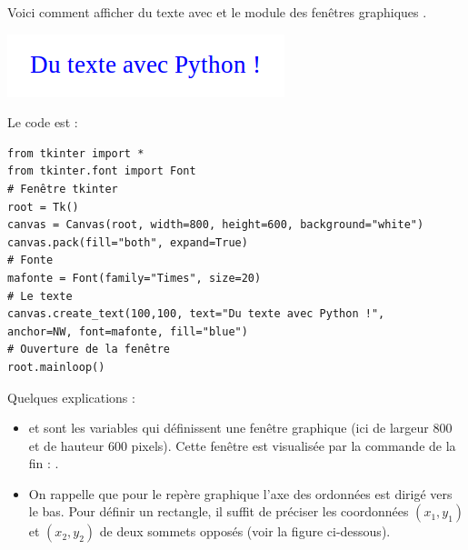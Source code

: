 \documentclass[11pt,class=report,crop=false]{standalone}
\begin{document}
\newcommand{\badletter}[1]{\underline{\textcolor{red}{#1}}}








\begin{cours}
Voici comment afficher du texte avec \Python{} et le module des fenêtres 
graphiques .


\begin{center}
\includegraphics[scale=0.6]{ecran-markdown-7}
\end{center}
Le code est :
\begin{lstlisting}
from tkinter import *
from tkinter.font import Font
# Fenêtre tkinter
root = Tk() 
canvas = Canvas(root, width=800, height=600, background="white")
canvas.pack(fill="both", expand=True)
# Fonte
mafonte = Font(family="Times", size=20)
# Le texte
canvas.create_text(100,100, text="Du texte avec Python !", 
anchor=NW, font=mafonte, fill="blue")
# Ouverture de la fenêtre
root.mainloop()
\end{lstlisting}



Quelques explications :
\begin{itemize}
  \item {} et  sont les variables qui définissent une fenêtre graphique (ici de largeur $800$ et de hauteur $600$ pixels). Cette fenêtre est visualisée par la commande de la fin : .
  
  \item On rappelle que pour le repère graphique l'axe des ordonnées est dirigé vers le bas. Pour définir un rectangle, il suffit de préciser les coordonnées 
  $(x_1,y_1)$ et $(x_2,y_2)$ de deux sommets opposés (voir la figure ci-dessous). 
  

\end{itemize}
\end{cours}
\end{document}
